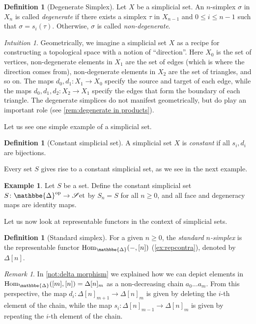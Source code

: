 \documentclass[11pt, a4paper]{amsart}
\def\DDelta{{\mathbbe{\Delta}}}
\newcommand{\DD}{\DDelta}
\newcommand{\Hom}{\mathrm{Hom}}
\newcommand{\op}{\mathrm{op}}
\newcommand{\Set}{\mathscr{S}\mathrm{et}}
\theoremstyle{definition}
\newtheorem{definition}[equation]{Definition}
\newtheorem{example}[equation]{Example}
\theoremstyle{remark}
\newtheorem{remark}[equation]{Remark}
\newtheorem{intuition}[equation]{Intuition}
\numberwithin{equation}{section}
\begin{document}
\begin{definition}[Degenerate Simplex]
 Let $X$ be a simplicial set. An $n$-simplex $\sigma$ in $X_n$ is called \emph{degenerate} if there exists a simplex $\tau$ in $X_{n-1}$ and $0 \leq i \leq n-1$ such that $\sigma = s_i(\tau)$. Otherwise, $\sigma$ is called \emph{non-degenerate}.  
\end{definition}

\begin{intuition}
  Geometrically, we imagine a simplicial set $X$ as a recipe for constructing a topological space with a notion of ``direction''. Here $X_0$ is the set of vertices, non-degenerate elements in $X_1$ are the set of edges (which is where the direction comes from), non-degenerate elements in $X_2$ are the set of triangles, and so on. The maps $d_0,d_1\colon X_1 \to X_0$ specify the source and target of each edge, while the maps $d_0,d_1,d_2\colon X_2 \to X_1$ specify the edges that form the boundary of each triangle. The degenerate simplices do not manifest geometrically, but do play an important role (see \cref{rem:degenerate in products}).
\end{intuition}

Let us see one simple example of a simplicial set.

\begin{definition}[Constant simplicial set] \label{def:constant simplicial set}
  A simplicial set $X$ is \emph{constant} if all $s_i, d_i$ are bijections.
\end{definition}

Every set $S$ gives rise to a constant simplicial set, as we see in the next example.

\begin{example} \label{ex:constant simplicial set}
  Let $S$ be a set. Define the constant simplicial set $S\colon \DD^{\op} \to \Set$ by $S_n = S$ for all $n \geq 0$, and all face and degeneracy maps are identity maps.
\end{example}

Let us now look at representable functors in the context of simplicial sets. 

\begin{definition}[Standard simplex] \label{def:standard simplex}
  For a given $n \geq 0$, the \emph{standard $n$-simplex} is the representable functor $\Hom_{\DD}(-,[n])$ (\cref{ex:repcontra}), denoted by $\Delta[n]$.
\end{definition}

\begin{remark} \label{rem:delta morphism}
  In \cref{not:delta morphism} we explained how we can depict elements in $\Hom_{\DD}([m],[n]) = \Delta[n]_m$ as a non-decreasing chain $a_0... a_m$. From this perspective, the map $d_i\colon \Delta[n]_{m+1} \to \Delta[n]_m$ is given by deleting the $i$-th element of the chain, while the map $s_i\colon \Delta[n]_{m-1} \to \Delta[n]_m$ is given by repeating the $i$-th element of the chain.
\end{remark}
\end{document}
